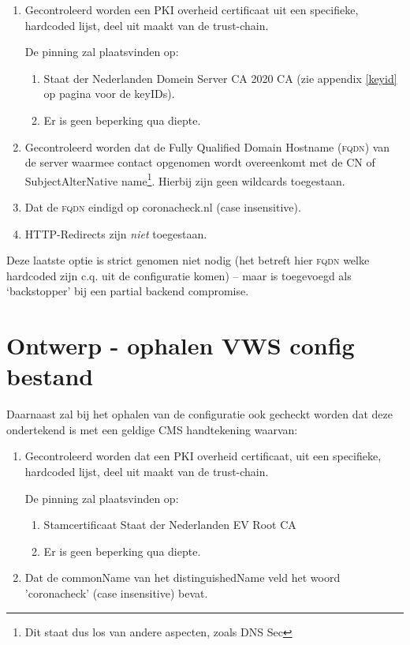 \documentclass[11.0pt,twoside,openright]{report}
\begin{document}
\begin{enumerate}
\item	Gecontroleerd worden een PKI overheid certificaat uit een specifieke, hardcoded lijst, deel uit maakt van de trust-chain.

De pinning zal plaatsvinden op:
\begin{enumerate}
\item Staat der Nederlanden Domein Server CA 2020 CA (zie appendix \ref{keyid} op pagina \pageref{keyid} voor de keyIDs).
\item Er is geen beperking qua diepte.
\end{enumerate}
\item 	Gecontroleerd worden dat de Fully Qualified Domain Hostname (\textsc{fqdn}) van de server waarmee contact opgenomen wordt overeenkomt met de CN of SubjectAlterNative name\footnote{Dit staat dus los van andere aspecten, zoals DNS Sec}. Hierbij zijn geen wildcards toegestaan. 
\item 	Dat de \textsc{fqdn} eindigd op coronacheck.nl (case insensitive).
\item HTTP-Redirects zijn \emph{niet} toegestaan.
\end{enumerate}

Deze laatste optie is strict genomen niet nodig (het betreft hier \textsc{fqdn} welke hardcoded zijn c.q. uit de configuratie komen) -- maar is toegevoegd als `backstopper' bij een partial backend compromise.

\section{Ontwerp - ophalen VWS config bestand}
\label{config}

Daarnaast zal bij het ophalen van de configuratie ook gecheckt worden dat deze ondertekend is met een geldige CMS handtekening waarvan:

\begin{enumerate}
\item	Gecontroleerd worden dat een PKI overheid certificaat, uit een specifieke, hardcoded lijst, deel uit maakt van de trust-chain.

De pinning zal plaatsvinden op:
\begin{enumerate}
\item Stamcertificaat Staat der Nederlanden EV Root CA
\item Er is geen beperking qua diepte.
\end{enumerate}
\item	Dat de commonName van het distinguishedName veld het woord 'coronacheck' (case insensitive) bevat.
\end{enumerate}
\end{document}
